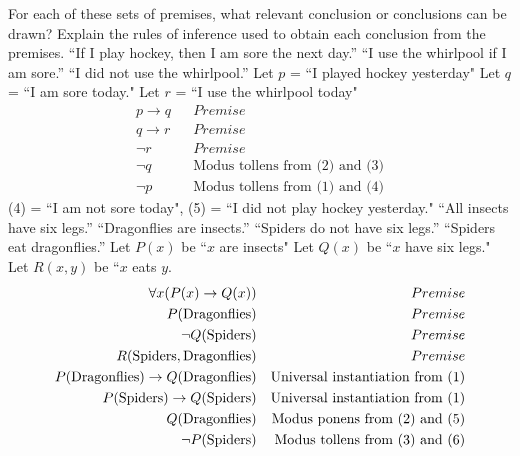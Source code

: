 \documentclass[12pt]{article}  %
\begin{document}
\newline
For each of these sets of premises, what relevant conclusion or conclusions can be drawn? Explain the rules of inference used to obtain each conclusion from the premises.\newline
\newline
``If I play hockey, then I am sore the next day.” ``I use the whirlpool if I am sore.” ``I did not use the whirlpool.”\newline
\newline
Let $p$ = ``I played hockey yesterday"\newline
Let $q$ = ``I am sore today."\newline
Let $r$ = ``I use the whirlpool today"
\begin{align}
    p\to q  & \textrm{} & Premise \\
    q\to r  & \textrm{} & Premise \\
    \neg{r} & \textrm{} & Premise \\
    \neg{q} & \textrm{} & \textrm{Modus tollens from (2) and (3)} \\
    \neg{p} & \textrm{} & \textrm{Modus tollens from (1) and (4)}
\end{align}
(4) = ``I am not sore today", (5) = ``I did not play hockey yesterday."\newline
\newline
``All insects have six legs.” ``Dragonflies are insects.” ``Spiders do not have six legs.” ``Spiders eat dragonflies.”\newline
\newline
Let $P(x)$ be ``$x$ are insects"\newline
Let $Q(x)$ be ``$x$ have six legs."\newline
Let $R(x,y)$ be ``$x$ eats $y$.
\begin{align}
    \setcounter{equation}{0}
    \forall x(P(x)\to Q(x))                                         & \textrm{} & Premise \\
    P(\textrm{Dragonflies})                                         & \textrm{} & Premise \\
    \neg{Q(\textrm{Spiders})}                                       & \textrm{} & Premise \\
    R(\textrm{Spiders}, \textrm{Dragonflies})                       & \textrm{} & Premise \\
    P(\textrm{Dragonflies})\to Q(\textrm{Dragonflies}) & \textrm{}  & \textrm{Universal instantiation from (1)} \\
    P(\textrm{Spiders})\to Q(\textrm{Spiders})                      & \textrm{} & \textrm{Universal instantiation from (1)} \\
    Q(\textrm{Dragonflies})                                         & \textrm{} & \textrm{Modus ponens from (2) and (5)} \\
    \neg{P(\textrm{Spiders})}                                       & \textrm{} & \textrm{Modus tollens from (3) and (6)}
\end{align}
\end{document}
